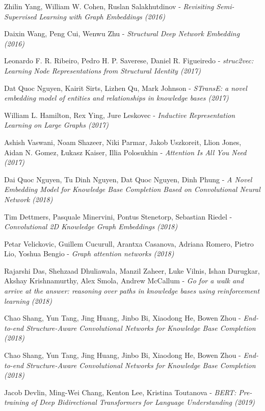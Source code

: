 \documentclass[longabstract, english, mgr]{iithesis}
\theoremstyle{default_theorem_style}\newtheorem{theorem}{Theorem}
\theoremstyle{default_theorem_style}\newtheorem{definition}{Definition}
\begin{document}
\begin{thebibliography}{99}
Zhilin Yang, William W. Cohen, Ruslan Salakhutdinov - \textit{
Revisiting Semi-Supervised Learning with Graph Embeddings (2016)}

Daixin Wang, Peng Cui, Wenwu Zhu - \textit{Structural Deep Network Embedding (2016)}

Leonardo F. R. Ribeiro, Pedro H. P. Saverese, Daniel R. Figueiredo - \textit{struc2vec: Learning Node
Representations from Structural Identity (2017)}

Dat Quoc Nguyen, Kairit Sirts, Lizhen Qu, Mark Johnson - \textit{STransE: a novel embedding model of entities and
relationships in knowledge bases (2017)}

William L. Hamilton, Rex Ying, Jure Leskovec - \textit{Inductive Representation Learning on Large Graphs (2017)}

Ashish Vaswani, Noam Shazeer, Niki Parmar, Jakob Uszkoreit, Llion Jones, Aidan N. Gomez, Łukasz Kaiser,
Illia Polosukhin - \textit{Attention Is All You Need (2017)}

Dai Quoc Nguyen, Tu Dinh Nguyen, Dat Quoc Nguyen, Dinh Phung - \textit{A Novel Embedding Model for Knowledge Base
Completion Based on Convolutional Neural Network (2018)}

Tim Dettmers, Pasquale Minervini, Pontus Stenetorp, Sebastian Riedel - \textit{Convolutional 2D Knowledge
Graph Embeddings (2018)}

Petar Velickovic, Guillem Cucurull, Arantxa Casanova, Adriana Romero, Pietro Lio, Yoshua Bengio - \textit{Graph
attention networks (2018)}

Rajarshi Das, Shehzaad Dhuliawala, Manzil Zaheer, Luke Vilnis, Ishan Durugkar, Akshay Krishnamurthy, Alex Smola,
Andrew McCallum - \textit{Go for a walk and arrive at the answer: reasoning over paths in knowledge bases using
reinforcement learning (2018)}

Chao Shang, Yun Tang, Jing Huang, Jinbo Bi, Xiaodong He, Bowen Zhou - \textit{
End-to-end Structure-Aware Convolutional Networks for Knowledge Base Completion (2018)}

Chao Shang, Yun Tang, Jing Huang, Jinbo Bi, Xiaodong He, Bowen Zhou - \textit{End-to-end Structure-Aware
Convolutional Networks for Knowledge Base Completion (2018)}

Jacob Devlin, Ming-Wei Chang, Kenton Lee, Kristina Toutanova - \textit{BERT: Pre-training of Deep Bidirectional
Transformers for Language Understanding (2019)}


\end{thebibliography}
\end{document}
